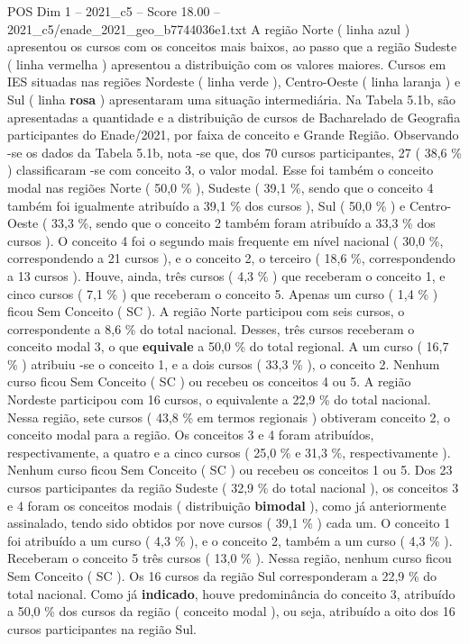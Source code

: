 \begin{textsample}{POS Dim 1 – 2021\_c5 – Score 18.00 – 2021\_c5/enade\_2021\_geo\_b7744036e1.txt}
A região Norte ( linha azul ) apresentou os cursos com os conceitos mais baixos, ao passo que a região Sudeste ( linha vermelha ) apresentou a distribuição com os valores maiores.
Cursos em IES situadas nas regiões Nordeste ( linha verde ), Centro-Oeste ( linha laranja ) e Sul ( linha \textbf{rosa} ) apresentaram uma situação intermediária.
Na Tabela 5.1b, são apresentadas a quantidade e a distribuição de cursos de Bacharelado de Geografia participantes do Enade/2021, por faixa de conceito e Grande Região.
Observando -se os dados da Tabela 5.1b, nota -se que, dos 70 cursos participantes, 27 ( 38,6 \% ) classificaram -se com conceito 3, o valor modal.
Esse foi também o conceito modal nas regiões Norte ( 50,0 \% ), Sudeste ( 39,1 \%, sendo que o conceito 4 também foi igualmente atribuído a 39,1 \% dos cursos ), Sul ( 50,0 \% ) e Centro-Oeste ( 33,3 \%, sendo que o conceito 2 também foram atribuído a 33,3 \% dos cursos ).
O conceito 4 foi o segundo mais frequente em nível nacional ( 30,0 \%, correspondendo a 21 cursos ), e o conceito 2, o terceiro ( 18,6 \%, correspondendo a 13 cursos ).
Houve, ainda, três cursos ( 4,3 \% ) que receberam o conceito 1, e cinco cursos ( 7,1 \% ) que receberam o conceito 5.
Apenas um curso ( 1,4 \% ) ficou Sem Conceito ( SC ).
A região Norte participou com seis cursos, o correspondente a 8,6 \% do total nacional.
Desses, três cursos receberam o conceito modal 3, o que \textbf{equivale} a 50,0 \% do total regional.
A um curso ( 16,7 \% ) atribuiu -se o conceito 1, e a dois cursos ( 33,3 \% ), o conceito 2.
Nenhum curso ficou Sem Conceito ( SC ) ou recebeu os conceitos 4 ou 5.
A região Nordeste participou com 16 cursos, o equivalente a 22,9 \% do total nacional.
Nessa região, sete cursos ( 43,8 \% em termos regionais ) obtiveram conceito 2, o conceito modal para a região.
Os conceitos 3 e 4 foram atribuídos, respectivamente, a quatro e a cinco cursos ( 25,0 \% e 31,3 \%, respectivamente ).
Nenhum curso ficou Sem Conceito ( SC ) ou recebeu os conceitos 1 ou 5.
Dos 23 cursos participantes da região Sudeste ( 32,9 \% do total nacional ), os conceitos 3 e 4 foram os conceitos modais ( distribuição \textbf{bimodal} ), como já anteriormente assinalado, tendo sido obtidos por nove cursos ( 39,1 \% ) cada um.
O conceito 1 foi atribuído a um curso ( 4,3 \% ), e o conceito 2, também a um curso ( 4,3 \% ).
Receberam o conceito 5 três cursos ( 13,0 \% ).
Nessa região, nenhum curso ficou Sem Conceito ( SC ).
Os 16 cursos da região Sul corresponderam a 22,9 \% do total nacional.
Como já \textbf{indicado}, houve predominância do conceito 3, atribuído a 50,0 \% dos cursos da região ( conceito modal ), ou seja, atribuído a oito dos 16 cursos participantes na região Sul.

\end{textsample}
